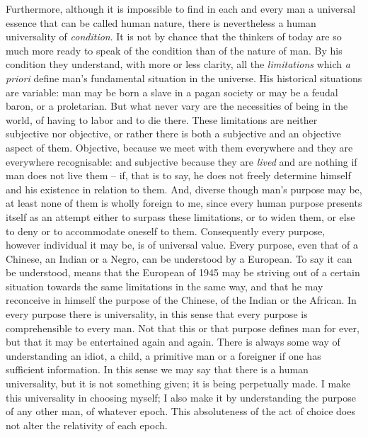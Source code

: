 \documentclass[12pt]{article}
\begin{document}
Furthermore, although it is impossible to find in each and every man a universal essence that can be called human nature, there is nevertheless a human universality of \textit{condition}. It is not by chance that the thinkers of today are so much more ready to speak of the condition than of the nature of man. By his condition they understand, with more or less clarity, all the \textit{limitations} which \textit{a priori} define man’s fundamental situation in the universe. His historical situations are variable: man may be born a slave in a pagan society or may be a feudal baron, or a proletarian. But what never vary are the necessities of being in the world, of having to labor and to die there. These limitations are neither subjective nor objective, or rather there is both a subjective and an objective aspect of them. Objective, because we meet with them everywhere and they are everywhere recognisable: and subjective because they are \textit{lived} and are nothing if man does not live them – if, that is to say, he does not freely determine himself and his existence in relation to them. And, diverse though man’s purpose may be, at least none of them is wholly foreign to me, since every human purpose presents itself as an attempt either to surpass these limitations, or to widen them, or else to deny or to accommodate oneself to them. Consequently every purpose, however individual it may be, is of universal value. Every purpose, even that of a Chinese, an Indian or a Negro, can be understood by a European. To say it can be understood, means that the European of 1945 may be striving out of a certain situation towards the same limitations in the same way, and that he may reconceive in himself the purpose of the Chinese, of the Indian or the African. In every purpose there is universality, in this sense that every purpose is comprehensible to every man. Not that this or that purpose defines man for ever, but that it may be entertained again and again. There is always some way of understanding an idiot, a child, a primitive man or a foreigner if one has sufficient information. In this sense we may say that there is a human universality, but it is not something given; it is being perpetually made. I make this universality in choosing myself; I also make it by understanding the purpose of any other man, of whatever epoch. This absoluteness of the act of choice does not alter the relativity of each epoch.
\end{document}

